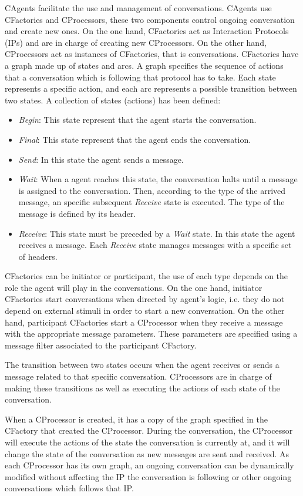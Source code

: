 CAgents facilitate the use and management of conversations. CAgents use CFactories and CProcessors, these two components control ongoing conversation and create new ones. On the one hand, CFactories act as Interaction Protocols (IPs) and are in charge of creating new CProcessors. On the other hand, CProcessors act as instances of CFactories, that is conversations. CFactories have a graph made up of states and arcs. A graph specifies the sequence of actions that a conversation which is following that protocol has to take. Each state represents a specific action, and each arc represents a possible transition between two states. A collection of states (actions) has been defined:
\begin{itemize}
\item \emph{Begin}: This state represent that the agent starts the conversation.
\item \emph{Final}: This state represent that the agent ends the conversation.
\item \emph{Send}: In this state the agent sends a message.
\item \emph{Wait}: When a agent reaches this state, the conversation halts until a message is assigned to the conversation.
Then, according to the type of the arrived message, an specific subsequent \emph{Receive} state is executed. The type of the message is defined by its header.
\item \emph{Receive}: This state must be preceded by a \emph{Wait} state. In this state the agent receives a message. Each \emph{Receive} state manages messages with a specific set of headers.
\end{itemize}
CFactories can be initiator or participant, the use of each type depends on the role the agent will play in the conversations. On the one hand, initiator CFactories start conversations when directed by agent's logic, i.e. they do not depend on external stimuli in order to start a new conversation. On the other hand, participant CFactories start a CProcessor when they receive a message with the appropriate message parameters. These parameters are specified using a message filter associated to the participant CFactory.

The transition between two states occurs when the agent receives or sends a message related to that specific conversation. CProcessors are in charge of making these transitions as well as executing the actions of each state of the conversation.

When a CProcessor is created, it has a copy of the graph specified in the CFactory that created the CProcessor. During the conversation, the CProcessor will execute the actions of the state the conversation is currently at, and it will change the state of the conversation as new messages are sent and received. As each CProcessor has its own graph, an ongoing conversation can be dynamically modified without affecting the IP the conversation is following or other ongoing conversations which follows that IP.

